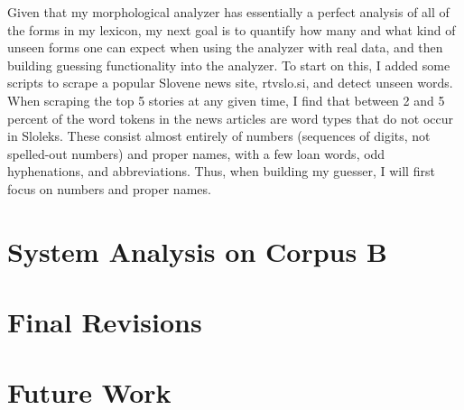 \documentclass[11pt,letterpaper]{article}
\begin{document}
Given that my morphological analyzer has essentially a perfect analysis of all
of the forms in my lexicon, my next goal is to quantify how many and what kind
of unseen forms one can expect when using the analyzer with real data, and then
building guessing functionality into the analyzer.  To start on this, I added
some scripts to scrape a popular Slovene news site, rtvslo.si, and detect
unseen words.  When scraping the top 5 stories at any given time, I find that
between 2 and 5 percent of the word tokens in the news articles are word types
that do not occur in Sloleks.  These consist almost entirely of numbers
(sequences of digits, not spelled-out numbers) and proper names, with a few
loan words, odd hyphenations, and abbreviations.  Thus, when building my
guesser, I will first focus on numbers and proper names.

\section{System Analysis on Corpus B}

\section{Final Revisions}

\section{Future Work}







\label{lastpage}
\end{document}
